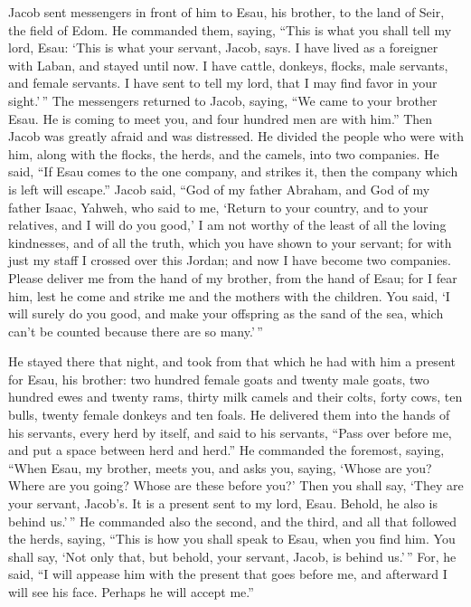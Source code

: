  Jacob sent messengers in front of him to Esau, his
brother, to the land of Seir, the field of Edom.  He
commanded them, saying, ``This is what you shall tell my lord, Esau:
`This is what your servant, Jacob, says. I have lived as a foreigner
with Laban, and stayed until now.  I have cattle, donkeys,
flocks, male servants, and female servants. I have sent to tell my lord,
that I may find favor in your sight.'\,''  The messengers
returned to Jacob, saying, ``We came to your brother Esau. He is coming
to meet you, and four hundred men are with him.''  Then
Jacob was greatly afraid and was distressed. He divided the people who
were with him, along with the flocks, the herds, and the camels, into
two companies.  He said, ``If Esau comes to the one
company, and strikes it, then the company which is left will escape.''
 Jacob said, ``God of my father Abraham, and God of my
father Isaac, Yahweh, who said to me, `Return to your country, and to
your relatives, and I will do you good,'  I am not worthy
of the least of all the loving kindnesses, and of all the truth, which
you have shown to your servant; for with just my staff I crossed over
this Jordan; and now I have become two companies.  Please
deliver me from the hand of my brother, from the hand of Esau; for I
fear him, lest he come and strike me and the mothers with the children.
 You said, `I will surely do you good, and make your
offspring as the sand of the sea, which can't be counted because there
are so many.'\,''

 He stayed there that night, and took from that which he
had with him a present for Esau, his brother:  two
hundred female goats and twenty male goats, two hundred ewes and twenty
rams,  thirty milk camels and their colts, forty cows,
ten bulls, twenty female donkeys and ten foals.  He
delivered them into the hands of his servants, every herd by itself, and
said to his servants, ``Pass over before me, and put a space between
herd and herd.''  He commanded the foremost, saying,
``When Esau, my brother, meets you, and asks you, saying, `Whose are
you? Where are you going? Whose are these before you?' 
Then you shall say, `They are your servant, Jacob's. It is a present
sent to my lord, Esau. Behold, he also is behind us.'\,''
 He commanded also the second, and the third, and all
that followed the herds, saying, ``This is how you shall speak to Esau,
when you find him.  You shall say, `Not only that, but
behold, your servant, Jacob, is behind us.'\,'' For, he said, ``I will
appease him with the present that goes before me, and afterward I will
see his face. Perhaps he will accept me.''


